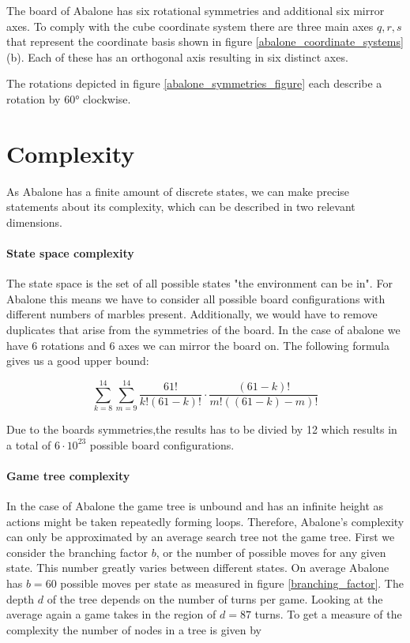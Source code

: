 The board of Abalone has six rotational symmetries and additional six mirror axes. To comply with the cube coordinate system there are three main axes $q, r, s$ that represent the coordinate basis shown in figure \ref{abalone_coordinate_systems} (b). Each of these has an orthogonal axis resulting in six distinct axes.

The rotations depicted in figure \ref{abalone_symmetries_figure} each describe a rotation by 60° clockwise.

\section{Complexity}
As Abalone has a finite amount of discrete states, we can make precise statements about its complexity, which can be described in two relevant dimensions.

\paragraph{State space complexity}
\label{state_space_complexity}

The state space is the set of all possible states "the environment can be in".\cite[p. 150]{russell_artificial_2021} For Abalone this means we have to consider all possible board configurations with different numbers of marbles present. Additionally, we would have to remove duplicates that arise from the symmetries of the board. In the case of abalone we have 6 rotations and 6 axes we can mirror the board on. The following formula gives us a good upper bound:

\begin{equation}
    \sum_{k=8}^{14}\sum_{m=9}^{14}\frac{61!}{k!(61-k)!}\cdot\frac{(61-k)!}{m!((61-k)-m)!}
\end{equation}

Due to the boards symmetries,the results has to be divied by 12 which results in a total of $ 6 \cdot 10^{23} $ possible board configurations. \cite[p. 4]{lemmens_constructing_2005}

\paragraph{Game tree complexity} In the case of Abalone the game tree is unbound and has an infinite height as actions might be taken repeatedly forming loops. Therefore, Abalone's complexity can only be approximated by an average search tree not the game tree. First we consider the branching factor $ b $, or the number of possible moves for any given state. This number greatly varies between different states. On average Abalone has $ b = 60 $ possible moves per state as measured in figure \ref{branching_factor}. The depth $ d $ of the tree depends on the number of turns per game. Looking at the average again a game takes in the region of $ d = 87 $ turns. To get a measure of the complexity the number of nodes in a tree is given by

